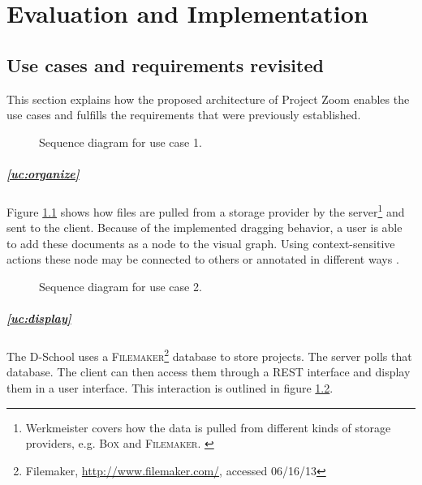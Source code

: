 \chapter{Evaluation and Implementation}

\section{Use cases and requirements revisited}

This section explains how the proposed architecture of Project Zoom enables the use cases and fulfills the requirements that were previously established.

\begin{figure}
\begin{center}
\caption{Sequence diagram for use case 1.}
\label{fig:evaluc1}
\end{center}
\end{figure}

\paragraph{\ref{uc:organize}} Figure \ref{fig:evaluc1} shows how files are pulled from a storage provider by the server\footnote{Werkmeister covers how the data is pulled from different kinds of storage providers, e.g. \textsc{Box} and \textsc{Filemaker}. \cite{Werkmeister_2013}} and sent to the client. Because of the implemented dragging behavior, a user is able to add these documents as a node to the visual graph. Using context-sensitive actions these node may be connected to others or annotated in different ways \cite{Herold_2013}. 

\begin{figure}
\begin{center}
\caption{Sequence diagram for use case 2.}
\label{fig:evaluc2}
\end{center}
\end{figure}

\paragraph{\ref{uc:display}} The D-School uses a \textsc{Filemaker}\footnote{Filemaker, \url{http://www.filemaker.com/}, accessed 06/16/13} database to store projects. The server polls that database. The client can then access them through a REST interface and display them in a user interface. This interaction is outlined in figure \ref{fig:evaluc2}.

